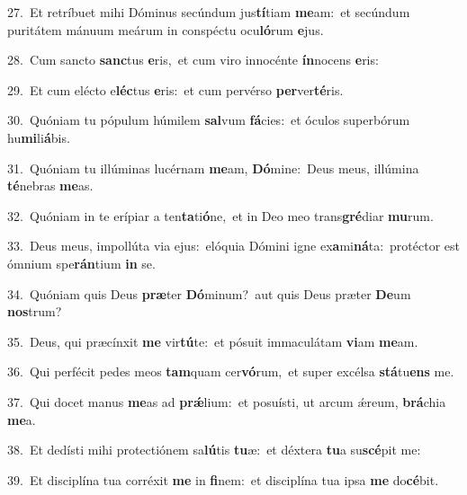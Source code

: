 {\numbfont\textcolor{\numbcolor}{27.}}~Et retríbuet mihi Dóminus secúndum jus\-\textbf{tí}\-tiam \textbf{me}\-am:~\star et secúndum puritátem mánuum meárum in conspéctu ocu\-\textbf{ló}\-rum \textbf{e}\-jus.\par
{\numbfont\textcolor{\numbcolor}{28.}}~Cum sancto \textbf{sanc}\-tus \textbf{e}\-ris,~\star et cum viro innocénte \textbf{ín}\-nocens \textbf{e}\-ris:\par
{\numbfont\textcolor{\numbcolor}{29.}}~Et cum elécto e\-\textbf{léc}\-tus \textbf{e}\-ris:~\star et cum pervérso \textbf{per}\-ver\-\textbf{té}\-ris.\par
{\numbfont\textcolor{\numbcolor}{30.}}~Quóniam tu pópulum húmilem \textbf{sal}\-vum \textbf{fá}\-cies:~\star et óculos superbórum hu\-\textbf{mi}\-li\-\textbf{á}\-bis.\par
{\numbfont\textcolor{\numbcolor}{31.}}~Quóniam tu illúminas lucérnam \textbf{me}\-am, \textbf{Dó}\-mine:~\star Deus meus, illúmina \textbf{té}\-nebras \textbf{me}\-as.\par
{\numbfont\textcolor{\numbcolor}{32.}}~Quóniam in te erípiar a ten\-\textbf{ta}\-ti\-\textbf{ó}\-ne,~\star et in Deo meo trans\-\textbf{gré}\-diar \textbf{mu}\-rum.\par
{\numbfont\textcolor{\numbcolor}{33.}}~Deus meus, impollúta via ejus:~\dagger elóquia Dómini igne ex\-\textbf{a}\-mi\-\textbf{ná}\-ta:~\star protéctor est ómnium spe\-\textbf{rán}\-tium \textbf{in} se.\par
{\numbfont\textcolor{\numbcolor}{34.}}~Quóniam quis Deus \textbf{præ}\-ter \textbf{Dó}\-minum?~\star aut quis Deus præter \textbf{De}\-um \textbf{nos}\-trum?\par
{\numbfont\textcolor{\numbcolor}{35.}}~Deus, qui præcínxit \textbf{me} vir\-\textbf{tú}\-te:~\star et pósuit immaculátam \textbf{vi}\-am \textbf{me}\-am.\par
{\numbfont\textcolor{\numbcolor}{36.}}~Qui perfécit pedes meos \textbf{tam}\-quam cer\-\textbf{vó}\-rum,~\star et super excélsa \textbf{stá}\-tu\textbf{ens} me.\par
{\numbfont\textcolor{\numbcolor}{37.}}~Qui docet manus \textbf{me}\-as ad \textbf{prǽ}\-lium:~\star et posuísti, ut arcum ǽreum, \textbf{brá}\-chia \textbf{me}\-a.\par
{\numbfont\textcolor{\numbcolor}{38.}}~Et dedísti mihi protectiónem sa\-\textbf{lú}\-tis \textbf{tu}\-æ:~\star et déxtera \textbf{tu}\-a su\-\textbf{scé}\-pit me:\par
{\numbfont\textcolor{\numbcolor}{39.}}~Et disciplína tua corréxit \textbf{me} in \textbf{fi}\-nem:~\star et disciplína tua ipsa \textbf{me} do\-\textbf{cé}\-bit.\par
